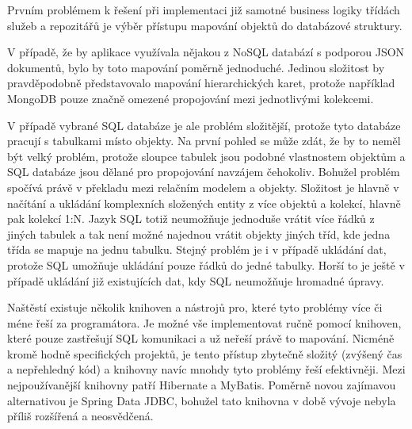 \begin{itemize}
\begin{itemize}
		Prvním problémem k řešení při implementaci již samotné business logiky třídách služeb a repozitářů je výběr
		přístupu mapování objektů do databázové struktury.

		V případě, že by aplikace využívala nějakou z \ac{NoSQL} databází s podporou \ac{JSON} dokumentů, bylo by toto
		mapování poměrně jednoduché.
		Jedinou složitost by pravděpodobně představovalo mapování hierarchických karet, protože například MongoDB pouze
		značně omezené propojování mezi jednotlivými kolekcemi.

		V případě vybrané \ac{SQL} databáze je ale problém složitější, protože tyto databáze pracují s tabulkami místo objekty.
		Na první pohled se může zdát, že by to neměl být velký problém, protože sloupce tabulek jsou podobné vlastnostem
		objektům a \ac{SQL} databáze jsou dělané pro propojování navzájem čehokoliv.
		Bohužel problém spočívá právě v překladu mezi relačním modelem a objekty.
		Složitost je hlavně v načítání a ukládání komplexních složených entity z více objektů a kolekcí, hlavně pak
		kolekcí 1:N.
		Jazyk \ac{SQL} totiž neumožňuje jednoduše vrátit více řádků z jiných tabulek a tak není možné najednou
		vrátit objekty jiných tříd, kde jedna třída se mapuje na jednu tabulku.
		Stejný problém je i v případě ukládání dat, protože \ac{SQL} umožňuje ukládání pouze řádků do jedné tabulky.
		Horší to je ještě v případě ukládání již existujících dat, kdy \ac{SQL} neumožňuje hromadné úpravy.

		Naštěstí existuje několik knihoven a nástrojů pro, které tyto problémy více či méne řeší za programátora.
		Je možné vše implementovat ručně pomocí knihoven, které pouze zastřešují \ac{SQL} komunikaci a už neřeší
		právě to mapování.
		Nicméně kromě hodně specifických projektů, je tento přístup zbytečně složitý (zvýšený čas a nepřehledný kód)
		a knihovny navíc mnohdy tyto problémy řeší efektivněji.
		Mezi nejpoužívanější knihovny patří Hibernate a MyBatis.
		Poměrně novou zajímavou alternativou je Spring Data JDBC, bohužel tato knihovna v době vývoje nebyla příliš
		rozšířená a neosvědčená.


\end{itemize}
\end{itemize}
